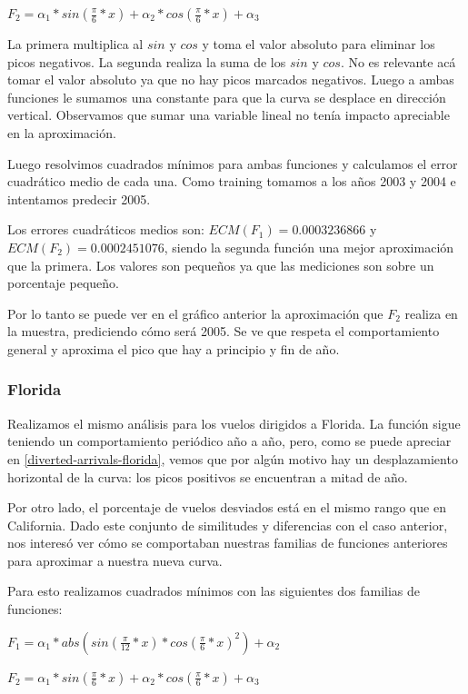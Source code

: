 \documentclass{endm}
\begin{document}
$F_2 = \alpha_1 * sin(\frac{\pi}{6}*x) + \alpha_2 * cos(\frac{\pi}{6}*x) + \alpha_3$


La primera multiplica al $sin$ y $cos$ y toma el valor absoluto para eliminar los picos negativos. La segunda realiza la suma de los $sin$ y $cos$. No es relevante ac\'a tomar el valor absoluto ya que no hay picos marcados negativos. Luego a ambas funciones le sumamos una constante para que la curva se desplace en direcci\'on vertical. Observamos que sumar una variable lineal no ten\'ia impacto apreciable en la aproximaci\'on. 

Luego resolvimos cuadrados m\'inimos para ambas funciones y calculamos el error cuadr\'atico medio de cada una. Como training tomamos a los a\~nos 2003 y 2004 e intentamos predecir 2005.

Los errores cuadr\'aticos medios son: $ECM(F_1) = 0.0003236866$ y $ECM(F_2) = 0.0002451076$, siendo la segunda funci\'on una mejor aproximaci\'on que la primera. Los valores son peque\~nos ya que las mediciones son sobre un porcentaje peque\~no.

Por lo tanto se puede ver en el gr\'afico anterior la aproximaci\'on que $F_2$ realiza en la muestra, prediciendo c\'omo ser\'a 2005. Se ve que respeta el comportamiento general y aproxima el pico que hay a principio y fin de a\~no.

\subsubsection{Florida}

Realizamos el mismo an\'alisis para los vuelos dirigidos a Florida. La funci\'on sigue teniendo un comportamiento peri\'odico a\~no a a\~no, pero, como se puede apreciar en \ref{diverted-arrivals-florida}, vemos que por alg\'un motivo hay un desplazamiento horizontal de la curva: los picos positivos se encuentran a mitad de a\~no.

Por otro lado, el porcentaje de vuelos desviados est\'a en el mismo rango que en California.
Dado este conjunto de similitudes y diferencias con el caso anterior, nos interes\'o ver c\'omo se comportaban nuestras familias de funciones anteriores para aproximar a nuestra nueva curva.

Para esto realizamos cuadrados m\'inimos con las siguientes dos familias de funciones:

$F_1 = \alpha_1 * abs(sin(\frac{\pi}{12}*x) * cos(\frac{\pi}{6}*x)^2) + \alpha_2$

$F_2 = \alpha_1 * sin(\frac{\pi}{6}*x) + \alpha_2 * cos(\frac{\pi}{6}*x) + \alpha_3$
\end{document}
